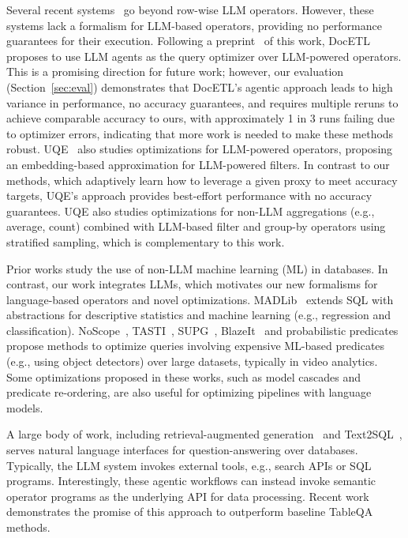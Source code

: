 Several recent systems~\cite{anderson_design_2024, dai_uqe_2024, shankar_docetl_2024} go beyond row-wise LLM operators. However, these systems lack a formalism for LLM-based operators, providing no performance guarantees for their execution.
Following a preprint~\cite{patel_lotus_2024} of this work, DocETL~\cite{shankar_docetl_2024} proposes to use LLM agents as the query optimizer over LLM-powered operators. This is a promising direction for future work; however, our evaluation (Section~\ref{sec:eval}) demonstrates that DocETL's agentic approach leads to high variance in performance, no accuracy guarantees, and requires multiple reruns to achieve comparable accuracy to ours, with approximately 1 in 3 runs failing due to optimizer errors, indicating that more work is needed to make these methods robust.
UQE~\cite{dai_uqe_2024} also studies optimizations for LLM-powered operators, proposing an embedding-based approximation for LLM-powered filters. In contrast to our methods, which adaptively learn how to leverage a given proxy to meet accuracy targets, UQE's approach provides best-effort performance with no accuracy guarantees. UQE also studies optimizations for non-LLM aggregations (e.g., average, count) combined with LLM-based filter and group-by operators using stratified sampling, which is complementary to this work.

 
Prior works study the use of non-LLM machine learning (ML) in databases. In contrast, our work integrates LLMs, which motivates our new formalisms for language-based operators and novel optimizations.
MADLib~\cite{hellerstein_madlib_2012} extends SQL with abstractions for descriptive statistics and machine learning (e.g., regression and classification). 
NoScope~\cite{kang_noscope_2017}, TASTI~\cite{kang_task-agnostic_nodate}, SUPG~\cite{kang_approximate_2020}, BlazeIt~\cite{kang_blazeit_2019} and probabilistic predicates~\cite{lu_accelerating_2018} propose methods to optimize queries involving expensive ML-based predicates (e.g., using object detectors) over large datasets, typically in video analytics. 
Some optimizations proposed in these works, such as model cascades and predicate re-ordering, are also useful for optimizing \sys pipelines with language models.


A large body of work, including  retrieval-augmented generation~\cite{lewis_retrieval-augmented_2021} and Text2SQL~\cite{yu_typesql_2018, yaghmazadeh_sqlizer_2017, zhang_benchmarking_2024, zelle_1996-learning_nodate},  serves natural language interfaces for question-answering over databases. Typically, the LLM system invokes external tools, e.g., search APIs or SQL programs. Interestingly, these agentic workflows can instead invoke semantic operator programs as the underlying API for data processing. Recent work~\cite{biswal_text2sql_2024} demonstrates the promise of this approach to outperform baseline TableQA methods.



